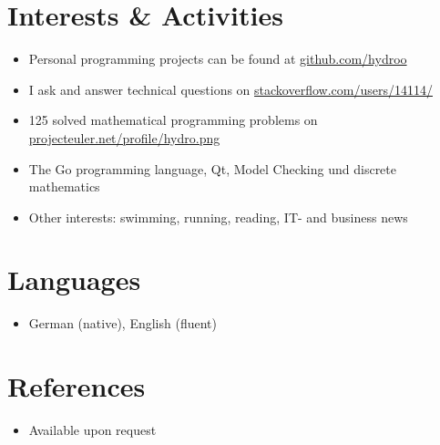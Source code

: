 \vspace{0.66cm} %

\customhrule
\section*{Interests \& Activities}
\begin{itemize}
	\item Personal programming projects can be found at \href{https://github.com/hydroo}{github.com/hydroo}
	\item I ask and answer technical questions on \href{http://stackoverflow.com/users/14114/}{stackoverflow.com/users/14114/}
	\item 125 solved mathematical programming problems on \href{http://projecteuler.net/profile/hydro.png}{projecteuler.net/profile/hydro.png}
	\item The Go programming language, Qt, Model Checking und discrete mathematics
	\item Other interests: swimming, running, reading, IT- and business news
\end{itemize}

\customhrule
\section*{Languages}
\begin{itemize}
	\item German (native), English (fluent)
\end{itemize}

\customhrule
\section*{References}
\begin{itemize}
	\item Available upon request
\end{itemize}


